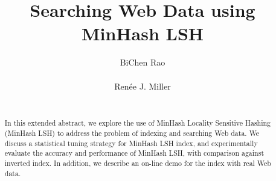 \documentclass{sig-alternate}
\begin{document}
\title{Searching Web Data using MinHash LSH}
%
%
%
%
%

%
\author{
%
%
\alignauthor
BiChen Rao\\
       \\
\alignauthor
Ren\'{e}e J. Miller\\
       \\
}

\maketitle
\begin{abstract}
In this extended abstract, we explore the use of MinHash Locality Sensitive Hashing
(MinHash LSH) to address the problem of indexing and searching Web data.
We discuss a statistical tuning strategy for MinHash LSH index, and
experimentally evaluate the accuracy and performance of MinHash LSH, with comparison against inverted index.
In addition, we describe an on-line demo for the 
index with real Web data.
\end{abstract}
\end{document}
